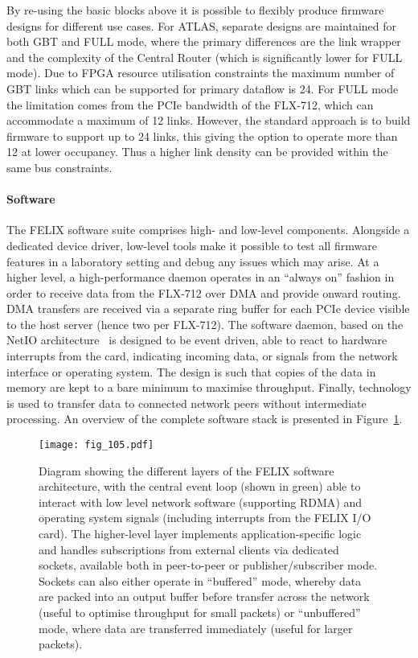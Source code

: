 \documentclass[cernpreprint, atlasdraft=false, UKenglish,british,orcidlogo, texmf, orcidlogo]{atlasdoc}
\begin{document}
By re-using the basic blocks above it is possible to flexibly produce firmware designs for different use cases. For ATLAS, separate designs are maintained for both \gls{GBT} and FULL mode, where the primary differences are the link wrapper and the complexity of the Central Router (which is significantly lower for FULL mode). Due to \gls{FPGA} resource utilisation constraints the maximum number of \gls{GBT} links which can be supported for primary dataflow is 24. For FULL mode the limitation comes from the \gls{PCIe}  bandwidth of the FLX-712, which can accommodate a maximum of 12 links. However, the standard approach is to build firmware to support up to 24 links, this giving the option to operate more than 12 at lower occupancy. Thus a higher link density can be provided within the same bus constraints.
 
\paragraph{ Software}
 
The \gls{FELIX} software suite comprises high- and low-level components. Alongside a dedicated device driver, low-level tools make it possible to test all firmware features in a laboratory setting and debug any issues which may arise. At a higher level, a high-performance daemon operates in an ``always on'' fashion in order to receive data from the FLX-712 over \gls{DMA} and provide onward routing. \gls{DMA} transfers are received via a separate ring buffer for each \gls{PCIe}  device visible to the host server (hence two per FLX-712). The software daemon, based on the NetIO architecture~\cite{8071057} is designed to be event driven, able to react to hardware interrupts from the card, indicating incoming data, or signals from the network interface or operating system. The design is such that copies of the data in memory are kept to a bare minimum to maximise throughput. Finally,  technology is used to transfer data to connected network peers without intermediate processing. An overview of the complete software stack is presented in Figure~\ref{fig:TDAQ_DAQHLT_felix_software}.
 
\begin{figure}[htbp!]
\centering
\texttt{[image: fig\_105.pdf]}
\caption{Diagram showing the different layers of the \gls{FELIX} software architecture, with the central event loop (shown in green) able to interact with low level network software (supporting \gls{RDMA}) and operating system signals (including interrupts from the \gls{FELIX} \gls{I/O} card). The higher-level layer implements application-specific logic and handles subscriptions from external clients via dedicated sockets, available both in peer-to-peer or publisher/subscriber mode. Sockets can also either operate in ``buffered'' mode, whereby data are packed into an output buffer before transfer across the network (useful to optimise throughput for small packets) or ``unbuffered'' mode, where data are transferred immediately (useful for larger packets).}
\label{fig:TDAQ_DAQHLT_felix_software}
\end{figure}
 
\end{document}
